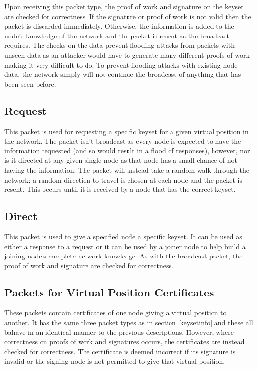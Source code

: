 \documentclass[ %
                    author={Luke Murray},
                supervisor={Dr. Simon Hollis},
                     title={Shadow Peer-to-Peer Networks},
                  subtitle={},
                    degree={MEng},
                      year={2013} ]{thesis}
\begin{document}
Upon receiving this packet type, the proof of work and signature on the keyset are checked for correctness. If the signature or proof of work is not valid then the packet is discarded immediately. Otherwise, the information is added to the node's knowledge of the network and the packet is resent as the broadcast requires. The checks on the data prevent flooding attacks from packets with unseen data as an attacker would have to generate many different proofs of work making it very difficult to do. To prevent flooding attacks with existing node data, the network simply will not continue the broadcast of anything that has been seen before.

\subsection{Request}

This packet is used for requesting a specific keyset for a given virtual position in the network. The packet isn't broadcast as every node is expected to have the information requested (and so would result in a flood of responses), however, nor is it directed at any given single node as that node has a small chance of not having the information. The packet will instead take a random walk through the network; a random direction to travel is chosen at each node and the packet is resent. This occurs until it is received by a node that has the correct keyset.

\subsection{Direct}

This packet is used to give a specified node a specific keyset. It can be used as either a response to a request or it can be used by a joiner node to help build a joining node's complete network knowledge. As with the broadcast packet, the proof of work and signature are checked for correctness.

\subsection{Packets for Virtual Position Certificates}

These packets contain certificates of one node giving a virtual position to another. It has the same three packet types as in section \ref{keysetinfo} and these all bahave in an identical manner to the previous descriptions. However, where correctness on proofs of work and signatures occurs, the certificates are instead checked for correctness. The certificate is deemed incorrect if its signature is invalid or the signing node is not permitted to give that virtual position.
\end{document}
